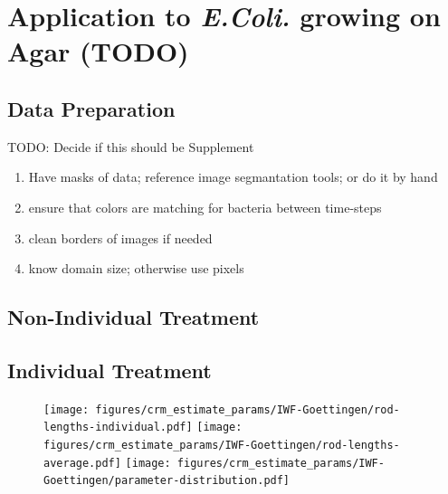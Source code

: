 \documentclass{article}
\begin{document}
\section{Application to \textit{E.Coli.} growing on Agar (TODO)}
\subsection{Data Preparation}
TODO: Decide if this should be Supplement
\begin{enumerate}
    \item Have masks of data; reference image segmantation tools; or do it by hand
    \item ensure that colors are matching for bacteria between time-steps
    \item clean borders of images if needed
    \item know domain size; otherwise use pixels
\end{enumerate}

\subsection{Non-Individual Treatment}
\subsection{Individual Treatment}
\label{subsec:parameter-estimation-individual-treatment}
\begin{figure}[H]
    \centering
    \texttt{[image: figures/crm\_estimate\_params/IWF-Goettingen/rod-lengths-individual.pdf]}%
    \texttt{[image: figures/crm\_estimate\_params/IWF-Goettingen/rod-lengths-average.pdf]}%
    \texttt{[image: figures/crm\_estimate\_params/IWF-Goettingen/parameter-distribution.pdf]}%
    \caption{}
    \label{fig:estimated-growth-rates}
\end{figure}
\end{document}
